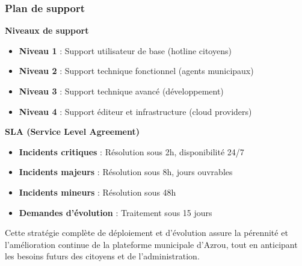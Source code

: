 \subsubsection{Plan de support}

\textbf{Niveaux de support}
\begin{itemize}
\item \textbf{Niveau 1} : Support utilisateur de base (hotline citoyens)
\item \textbf{Niveau 2} : Support technique fonctionnel (agents municipaux)
\item \textbf{Niveau 3} : Support technique avancé (développement)
\item \textbf{Niveau 4} : Support éditeur et infrastructure (cloud providers)
\end{itemize}

\textbf{SLA (Service Level Agreement)}
\begin{itemize}
\item \textbf{Incidents critiques} : Résolution sous 2h, disponibilité 24/7
\item \textbf{Incidents majeurs} : Résolution sous 8h, jours ouvrables
\item \textbf{Incidents mineurs} : Résolution sous 48h
\item \textbf{Demandes d'évolution} : Traitement sous 15 jours
\end{itemize}

Cette stratégie complète de déploiement et d'évolution assure la pérennité et l'amélioration continue de la plateforme municipale d'Azrou, tout en anticipant les besoins futurs des citoyens et de l'administration.

